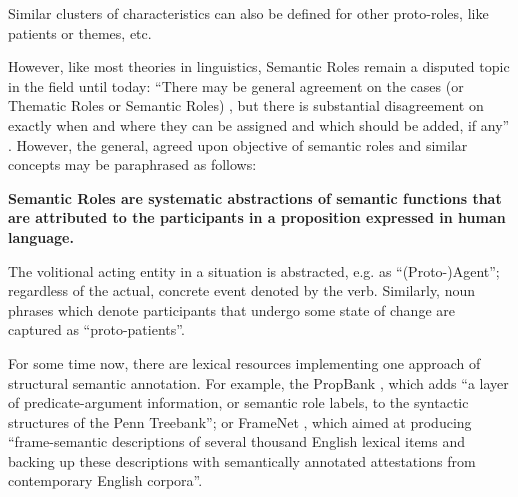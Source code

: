 Similar clusters of characteristics can also be defined for other proto-roles, like
patients or themes, etc.

However, like most theories in linguistics, Semantic Roles
remain a disputed topic in the field until today: ``There may be general agreement on
the cases (or Thematic Roles or Semantic Roles) \textelp{}, but there is substantial
disagreement on exactly when and where they can be assigned and which \textelp{}
should be added, if any'' \citep{palmer2010semantic}. However, the general, agreed
upon objective of semantic roles and similar concepts may be paraphrased as follows:

\begin{examples}
  \item \textbf{Semantic Roles are systematic abstractions of semantic functions that are attributed
  to the participants in a proposition expressed in human language.}
\end{examples}

The volitional acting entity in a situation is abstracted, e.g. as ``(Proto-)Agent''; regardless of
the actual, concrete event denoted by the verb. Similarly, noun phrases which denote participants
that undergo some state of change are captured as ``proto-patients''.


For some time now, there are lexical resources implementing one approach of structural
semantic annotation. For example, the PropBank \citep{palmer2005proposition}, which adds
``a layer of predicate-argument information, or semantic role labels, to the syntactic
structures of the Penn Treebank''; or FrameNet \citep{baker1998berkeley}, which aimed at
producing ``frame-semantic descriptions of several thousand English lexical items and
backing up these descriptions with semantically annotated attestations from contemporary
English corpora''.


